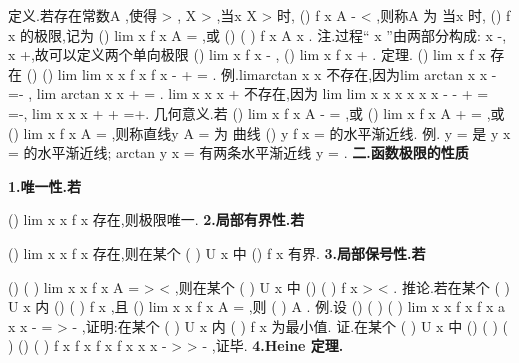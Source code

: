 \textcolor{lyred}{定义}.若存在常数A ,使得
\varepsilon 
\forall >
,
X
\exists 
>
,当x
X
>
时,
()
f x
A
\varepsilon 
-
<
,则称A 为 
当x \to \infty 时,
()
f x 的\textcolor{lyred}{极限},记为
()
lim
x
f x
A
\to \infty 
=
,或
()
(
)
f x
A x
\to 
\to \infty . 
\textcolor{lyred}{注}.过程“ x \to \infty ”由两部分构成: x \to -\infty , x \to +\infty ,故可以定义两个\textcolor{lyred}{单向极限} 
()
lim
x
f x
\to -\infty 
,
()
lim
x
f x
\to +\infty 
. 
\textcolor{lyred}{定理}.
()
lim
x
f x
\to \infty 
存在
()
()
lim
lim
x
x
f x
f x
\to -\infty 
\to +\infty 
\Leftrightarrow 
=
. 
\textcolor{lyred}{例}.limarctan
x
x
\to \infty 
不存在,因为lim arctan
x
x
\pi 
\to -\infty 
=-
, lim arctan
x
x
\pi 
\to +\infty 
=
. 
lim
x
x
x
\to \infty 
+
不存在,因为
lim
lim
x
x
x
x
x
x
\to -\infty 
\to -\infty 
+
=
=-,
lim
x
x
x
\to +\infty 
+
=+. 
\textcolor{lyred}{几何意义}.若
()
lim
x
f x
A
\to -\infty 
=
,或
()
lim
x
f x
A
\to +\infty 
=
,或
()
lim
x
f x
A
\to \infty 
=
,则称直线y
A
=
为 
曲线
()
y
f x
=
的\textcolor{lyred}{水平渐近线}. 
\textcolor{lyred}{例}.
y =
是
y
x
=
的水平渐近线;
arctan
y
x
=
有两条水平渐近线
y
\pi 
=\pm 
. 
\vspace{4pt}
{\bfseries \textcolor{lyred}{二.函数极限的性质}}

{\bfseries \textcolor{lyred}{1.唯一性.若}}

()
lim
x
x f x
\to 
存在,则极限唯一. 
{\bfseries \textcolor{lyred}{2.局部有界性.若}}

()
lim
x
x f x
\to 
存在,则在某个
(
)
U x
\circ 
中
()
f x 有界. 
{\bfseries \textcolor{lyred}{3.局部保号性.若}}

()
(
)
lim
x
x f x
A
\to 
=
>
<
,则在某个
(
)
U x
\circ 
中
()
(
)
f x >
<
. 
\textcolor{lyred}{推论}.若在某个
(
)
U x
\circ 
内
()
(
)
f x \ge 
\le 
,且
()
lim
x
x f x
A
\to 
=
,则
(
)
A \ge 
\le 
. 
\textcolor{lyred}{例}.设
()
(
)
(
)
lim
x
x
f x
f x
a
x
x
\to 
-
=
>
-
,证明:在某个
(
)
U x
内
(
)
f x
为最小值. 
证.在某个
(
)
U x
\circ 
中
()
(
)
(
)
()
(
)
f x
f x
f x
f x
x
x
-
>
\Rightarrow 
>
-
,证毕. 
{\bfseries \textcolor{lyred}{4.Heine 定理.}}

